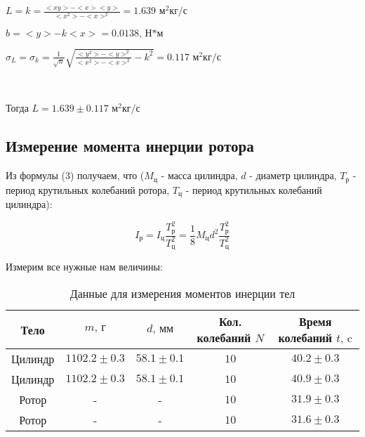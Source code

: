 \documentclass[a4paper]{article}
\begin{document}
\item $L = k = \frac{<xy> - <x><y>}{<x^2> - <x>^2} = 1.639 \text{ м$^2$кг/с}$
\item $b = <y> - k<x> = 0.0138 \text{, Н*м}$

\item $\sigma_L = \sigma_k = \frac{1}{\sqrt{n}} \sqrt{\frac{<y^2> - <y>^2}{<x^2> - <x>^2} - k^2} = 0.117 \text{ м$^2$кг/с}$

\\

\item Тогда $L = 1.639 \pm{0.117} \text{ м$^2$кг/с}$

\subsection{Измерение момента инерции ротора}

Из формулы (3) получаем, что ($M_\text{ц}$ - масса цилиндра, $d$ - диаметр цилиндра, $T_\text{р}$ - период крутильных колебаний ротора, $T_\text{ц}$ - период крутильных колебаний цилиндра):

\begin{equation}
	 I_\text{р} = I_\text{ц} \frac{T_\text{р}^2}{T_\text{ц}^2} = \frac{1}{8} M_\text{ц}d^2 \frac{T_\text{р}^2}{T_\text{ц}^2}
\end{equation}

\newpage

Измерим все нужные нам величины:

\begin{table}[h!]
\centering
\caption{Данные для измерения моментов инерции тел}
\begin{tabular}{|c|c|c|c|c|}
\hline
Тело & $m\text{, г}$ & $d\text{, мм}$ & Кол. колебаний $N$ & Время колебаний $t\text{, c}$  \\ \hline

Цилиндр & $1102.2\pm{0.3}$ & $58.1\pm{0.1}$ & $10$ & $40.2\pm{0.3}$  \\ \hline

Цилиндр & $1102.2\pm{0.3}$ & $58.1\pm{0.1}$ & $10$ & $40.9\pm{0.3}$  \\ \hline

Ротор & - & - & $10$ & $31.9\pm{0.3}$ \\ \hline

Ротор & - & - & $10$ & $31.6\pm{0.3}$ \\ \hline

\end{tabular}
\end{table}
\end{document}
